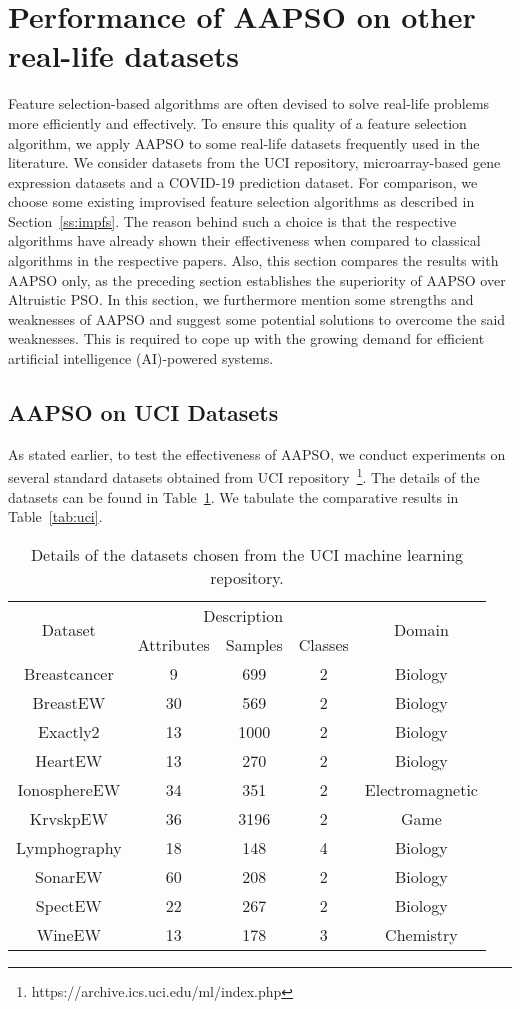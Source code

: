 \documentclass[final,3p,times]{elsarticle}
\begin{document}
\section{Performance of AAPSO on other real-life datasets}\label{sec:real}
{Feature {selection-based} algorithms are often {devised} to solve real-life problems more efficiently and effectively. To ensure this quality of a feature selection algorithm, we apply AAPSO to some real-life datasets frequently {used} in the literature. We consider datasets from the UCI repository, microarray-based gene expression datasets and a COVID-19 prediction dataset. For comparison, we choose some existing improvised feature selection algorithms as described in Section~\ref{ss:impfs}. The reason behind such a choice is that the respective algorithms have already shown their effectiveness when compared to classical algorithms in the respective papers. {Also,} this section compares the results with AAPSO {only,} as the preceding section establishes the superiority of AAPSO over {Altruistic PSO}. In this section, we {furthermore} mention some strengths and weaknesses of AAPSO and suggest some potential solutions to overcome the said weaknesses. This is required to cope up with the growing demand for efficient artificial intelligence (AI)-powered systems.}
\subsection{AAPSO on UCI Datasets}
{As stated earlier, to test the effectiveness of AAPSO, {we conduct} experiments on several standard datasets obtained from UCI repository~\footnote{https://archive.ics.uci.edu/ml/index.php}. The details of {the datasets} can be found in Table~\ref{tab:ucides}. We tabulate the comparative results in Table~\ref{tab:uci}.}
\begin{table}[ht!]
    \centering
    \caption{{Details of the datasets chosen from the UCI machine learning repository.}}
    \begin{tabular}{c|ccc|c}
    \toprule
    \multirow{2}{*}{Dataset} & \multicolumn{3}{c|}{Description} & \multirow{2}{*}{Domain}\\
    \cmidrule{2-4}
       & Attributes & Samples & Classes & \\
       \midrule
Breastcancer&	9&	699&	2&	Biology\\
BreastEW&	30&	569&	2&	Biology\\
Exactly2&	13&	1000&	2&	Biology\\
HeartEW&	13&	270&	2&	Biology\\
IonosphereEW&	34&	351&	2&	Electromagnetic\\
KrvskpEW&	36&	3196&	2&	Game\\
Lymphography&	18&	148&	4&	Biology\\
SonarEW&	60&	208&	2&	Biology\\
SpectEW&	22&	267&	2&	Biology\\
WineEW&	13&	178&	3&	Chemistry\\
\bottomrule
    \end{tabular}
    
    \label{tab:ucides}
\end{table}
\end{document}
